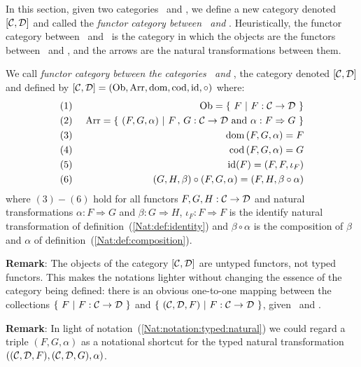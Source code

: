 In this section, given two categories \Cat\ and \Dat, we define a new 
category denoted $[\mbox{$\cal C$},\mbox{$\cal D$}]$ and called the {\em functor category between
\Cat\ and \Dat}. Heuristically, the functor category between \Cat\ and \Dat\
is the category in which the objects are the functors between \Cat\ and \Dat,
and the arrows are the natural transformations between them.
\begin{defin}\label{Nat:def:functor:category}
    We call {\em functor category between the categories \Cat\ and \Dat}, 
    the category denoted $[\mbox{$\cal C$},\mbox{$\cal D$}]$ and  defined by 
    $[\mbox{$\cal C$},\mbox{$\cal D$}]=(\mbox{\rm Ob},\mbox{\rm Arr},\mbox{\rm dom},\mbox{\rm cod},\mbox{\rm id},\circ)$ where:
        \begin{eqnarray*}
            (1)&\ &\ob=\{\ F\ |\ F:\Cat\to\Dat\ \}\\
            (2)&\ &\arr=\{\ (F,G,\alpha)\ |\ F\,,\,G:\Cat\to\Dat\ 
            \mbox{and}\ \alpha:F\Rightarrow G\ \}\\
            (3)&\ &\dom\,(F,G,\alpha)=F\\
            (4)&\ &\cod\,(F,G,\alpha)=G\\
            (5)&\ &\id(F)=(F,F,\iota_{F})\\
            (6)&\ &(G,H,\beta)\circ(F,G,\alpha)=(F,H,\beta\circ\alpha)
        \end{eqnarray*}
    where $(3)-(6)$ hold for all functors $F,G,H:\mbox{$\cal C$}\to\mbox{$\cal D$}$ and natural
    transformations $\alpha:F\Rightarrow G$ and $\beta:G\Rightarrow H$,
    $\iota_{F}:F\Rightarrow F$ is the identify natural transformation 
    of definition~(\ref{Nat:def:identity}) and $\beta\circ\alpha$ is the
    composition of $\beta$ and $\alpha$ of definition~(\ref{Nat:def:composition}).
\end{defin}

\noindent
{\bf Remark}: The objects of the category $[\mbox{$\cal C$},\mbox{$\cal D$}]$ are untyped functors,
not typed functors. This makes the notations lighter without changing
the essence of the category being defined: there is an obvious one-to-one
mapping between the collections $\{\ F\ |\ F:\Cat\to\Dat\ \}$
and $\{\ (\Cat,\Dat,F)\ |\ F:\Cat\to\Dat\ \}$, given \Cat\ and \Dat.

\noindent
{\bf Remark}: In light of notation~(\ref{Nat:notation:typed:natural}) we could
regard a triple $(F,G,\alpha)$ as a notational shortcut for the typed natural 
transformation $((\mbox{$\cal C$},\mbox{$\cal D$},F),(\mbox{$\cal C$},\mbox{$\cal D$},G),\alpha)$. 
